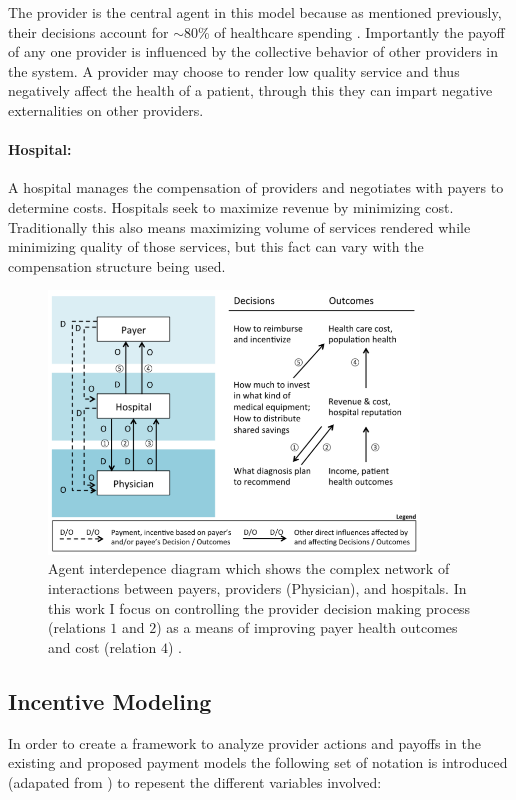 \documentclass{article}
\begin{document}
The provider is the central agent in this model because as mentioned previously, their decisions account for ${\sim}80$\% of healthcare spending \cite{trust}. Importantly the payoff of any one provider is influenced by the collective behavior of other providers in the system. A provider may choose to render low quality service and thus negatively affect the health of a patient, through this they can impart negative externalities on other providers.

\paragraph{Hospital:}A hospital manages the compensation of providers and negotiates with payers to determine costs. Hospitals seek to maximize revenue by minimizing cost. Traditionally this also means maximizing volume of services rendered while minimizing quality of those services, but this fact can vary with the compensation structure being used.

\begin{figure}[H]
\includegraphics[height=7cm]{agentdep}
\centering
\caption{Agent interdepence diagram which shows the complex network of interactions between payers, providers (Physician), and hospitals. In this work I focus on controlling the provider decision making process (relations $1$ and $2$) as a means of improving payer health outcomes and cost (relation $4$) \cite{msdt}.}
\label{fig:agentdep}
\end{figure}

\subsection{Incentive Modeling}
In order to create a framework to analyze provider actions and payoffs in the existing and proposed payment models the following set of notation is introduced (adapated from \cite{trust}\cite{blended}) to repesent the different variables involved:
\end{document}
